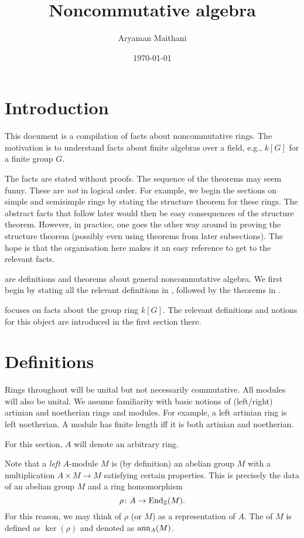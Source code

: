 \documentclass[12pt]{article}
\title{Noncommutative algebra}
\author{Aryaman Maithani}
\date{\today}
\begin{document}
\maketitle
\tableofcontents

\part*{Introduction}

This document is a compilation of facts about noncommutative rings. 
The motivation is to understand facts about finite algebras over a field, 
e.g., $k[G]$ for a finite group $G$. 

The facts are stated without proofs. 
The sequence of the theorems may seem funny. 
These are \emph{not} in logical order. 
For example, we begin the sections on simple and semisimple rings by stating the structure theorem for these rings. 
The abstract facts that follow later would then be easy consequences of the structure theorem. 
However, in practice, one goes the other way around in proving the structure theorem (possibly even using theorems from later subsections). 
The hope is that the organisation here makes it an easy reference to get to the relevant facts. 

 are definitions and theorems about general noncommutative algebra. 
We first begin by stating all the relevant definitions in , 
followed by the theorems in . 

 focuses on facts about the group ring $k[G]$. 
The relevant definitions and notions for this object are introduced in the first section there.

\part{Definitions} \label{part:definitions}

Rings throughout will be unital but not necessarily commutative. 
All modules will also be unital. 
We assume familiarity with basic notions of (left/right) artinian and noetherian rings and modules. 
For example, a left artinian ring is left noetherian. 
A module has finite length iff it is both artinian and noetherian.

For this section, $A$ will denote an arbitrary ring. 

Note that a \emph{left} $A$-module $M$ is (by definition) an abelian group $M$ with a multiplication $A \times M \to M$ satisfying certain properties. 
This is precisely the data of an abelian group $M$ and a ring homomorphism
\begin{equation*} 
	\rho \colon A \to \operatorname{End}_{\mathbb{Z}}(M).
\end{equation*}
For this reason, we may think of $\rho$ (or $M$) as a representation of $A$. 
The  of $M$ is defined as $\ker(\rho)$ and denoted as $\operatorname{ann}_{A}(M)$.
\end{document}
